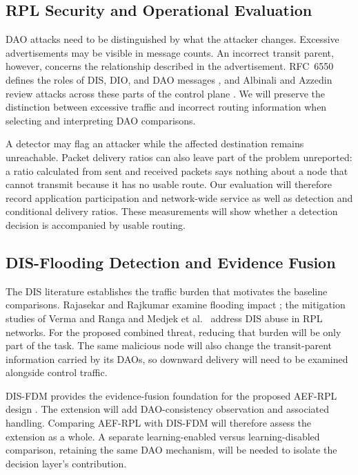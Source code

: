 \documentclass[journal]{IEEEtran}
\begin{document}
\subsection{RPL Security and Operational Evaluation}
DAO attacks need to be distinguished by what the attacker changes. Excessive advertisements may be visible in message counts. An incorrect transit parent, however, concerns the relationship described in the advertisement. RFC~6550 defines the roles of DIS, DIO, and DAO messages \cite{rfc6550}, and Albinali and Azzedin review attacks across these parts of the control plane \cite{albinali2024}. We will preserve the distinction between excessive traffic and incorrect routing information when selecting and interpreting DAO comparisons.

A detector may flag an attacker while the affected destination remains unreachable. Packet delivery ratios can also leave part of the problem unreported: a ratio calculated from sent and received packets says nothing about a node that cannot transmit because it has no usable route. Our evaluation will therefore record application participation and network-wide service as well as detection and conditional delivery ratios. These measurements will show whether a detection decision is accompanied by usable routing.

\subsection{DIS-Flooding Detection and Evidence Fusion}
The DIS literature establishes the traffic burden that motivates the baseline comparisons. Rajasekar and Rajkumar examine flooding impact \cite{rajasekar2022}; the mitigation studies of Verma and Ranga \cite{vermaranga2020} and Medjek et al.\ \cite{medjek2021} address DIS abuse in RPL networks. For the proposed combined threat, reducing that burden will be only part of the task. The same malicious node will also change the transit-parent information carried by its DAOs, so downward delivery will need to be examined alongside control traffic.

DIS-FDM provides the evidence-fusion foundation for the proposed AEF-RPL design \cite{prajisha2025}. The extension will add DAO-consistency observation and associated handling. Comparing AEF-RPL with DIS-FDM will therefore assess the extension as a whole. A separate learning-enabled versus learning-disabled comparison, retaining the same DAO mechanism, will be needed to isolate the decision layer's contribution.
\end{document}
